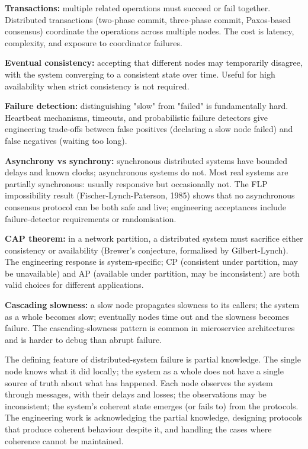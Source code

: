 \textbf{Transactions:} multiple related operations must succeed or fail together. Distributed transactions (two-phase commit, three-phase commit, Paxos-based consensus) coordinate the operations across multiple nodes. The cost is latency, complexity, and exposure to coordinator failures.

\textbf{Eventual consistency:} accepting that different nodes may temporarily disagree, with the system converging to a consistent state over time. Useful for high availability when strict consistency is not required.

\textbf{Failure detection:} distinguishing "slow" from "failed" is fundamentally hard. Heartbeat mechanisms, timeouts, and probabilistic failure detectors give engineering trade-offs between false positives (declaring a slow node failed) and false negatives (waiting too long).

\textbf{Asynchrony vs synchrony:} synchronous distributed systems have bounded delays and known clocks; asynchronous systems do not. Most real systems are partially synchronous: usually responsive but occasionally not. The FLP impossibility result (Fischer-Lynch-Paterson, 1985) shows that no asynchronous consensus protocol can be both safe and live; engineering acceptances include failure-detector requirements or randomisation.

\textbf{CAP theorem:} in a network partition, a distributed system must sacrifice either consistency or availability (Brewer's conjecture, formalised by Gilbert-Lynch). The engineering response is system-specific; CP (consistent under partition, may be unavailable) and AP (available under partition, may be inconsistent) are both valid choices for different applications.

\textbf{Cascading slowness:} a slow node propagates slowness to its callers; the system as a whole becomes slow; eventually nodes time out and the slowness becomes failure. The cascading-slowness pattern is common in microservice architectures and is harder to debug than abrupt failure.

\begin{archetype}
The defining feature of distributed-system failure is partial knowledge. The single node knows what it did locally; the system as a whole does not have a single source of truth about what has happened. Each node observes the system through messages, with their delays and losses; the observations may be inconsistent; the system's coherent state emerges (or fails to) from the protocols. The engineering work is acknowledging the partial knowledge, designing protocols that produce coherent behaviour despite it, and handling the cases where coherence cannot be maintained.
\end{archetype}


